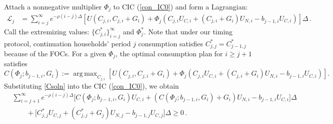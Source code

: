 \documentclass[12pt]{article}
\DeclareMathOperator*{\argmax}{arg\,max}
\begin{document}
Attach a  nonnegative multiplier  $\Phi_j$  to CIC (\ref{con_IC0}) and form  a Lagrangian: 
\begin{align}\label{Lj}
	{\mathcal L}^{}_j & =  \sum_{i=j}^{\infty}  e^{-\rho (i-j)\Delta}\left[ U(C_{j, i}, C_{j, i}+G_{i})+ \Phi_j^{}\left( C_{j, i}U_{C, i}+(C_{j, i}+G_{i})U_{N, i}-b_{j-1, i}^{} U_{C, i}\right)  \right] \Delta \, . %
\end{align} %
Call the extremizing values: $\{C_{j, i}^*\}_{i=j}^\infty$ and $\Phi_j^*$. Note that under our timing protocol, continuation households' period $j$ consumption satisfies $C_{j, j}^*=C_{j-1, j}^*$ because of the FOCs.
For a given $\Phi_j$, the optimal consumption plan for $i\geq j+1$ satisfies%
\begin{equation}\label{Csolnj}
	C(\Phi_j; b_{j-1, i}, G_{i}):=\argmax_{C_{j, i}}  \left[ U(C_{j, i}, C_{j, i}+G_{i})+ \Phi_j\left( C_{j, i}U_{C, i}+(C_{j, i}+G_{i})U_{N, i}-b_{j-1, i} U_{C, i} \right) \right] .
\end{equation}
Substituting  \eqref{Csoln} into  the CIC (\ref{con_IC0}), we obtain
\begin{align}\label{eqPhij}
	& \sum_{i=j+1}^{\infty} e^{-\rho (i-j)\Delta} \big[ C(\Phi_j; b_{j-1, i}, G_{i})U_{C, i}+(C(\Phi_j; b_{j-1, i}, G_{i})+G_i)U_{N, i}-b_{j-1, i} U_{C, i} \big]\Delta \nonumber\\
	&\quad \quad + \big[ C_{j, j}^*U_{C, j}+(C_{j, j}^*+G_j)U_{N, j}-b_{j-1, j} U_{C, j} \big]\Delta \geq  0\,.
\end{align}
\end{document}

